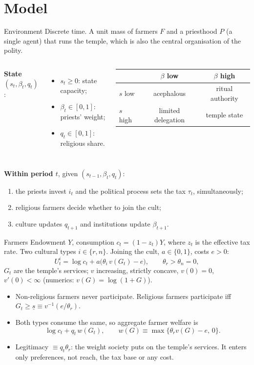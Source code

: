 \documentclass[11pt,aspectratio=169]{beamer}
\begin{document}
\section{Model}

\begin{frame}{Environment}
Discrete time. A unit mass of farmers $F$ and a priesthood $P$ (a single agent) that runs the
temple, which is also the central organisation of the polity.

\medskip
\begin{columns}[T]
\textbf{State} $(s_t,\beta_t,q_t)$:
\begin{itemize}
\item $s_t\ge0$: state capacity;
\item $\beta_t\in[0,1]$: priests' weight;
\item $q_t\in[0,1]$: religious share.
\end{itemize}
\centering\small
\begin{tabular}{l|cc}
 & $\beta$ low & $\beta$ high \\
\hline
$s$ low & acephalous & ritual authority\\[3pt]
$s$ high & limited delegation & temple state
\end{tabular}
\end{columns}

\medskip
\textbf{Within period $t$}, given $(s_{t-1},\beta_t,q_t)$:
\begin{enumerate}
\item the priests invest $i_t$ and the political process sets the tax $\tau_t$, simultaneously;
\item religious farmers decide whether to join the cult;
\item culture updates $q_{t+1}$ and institutions update $\beta_{t+1}$.
\end{enumerate}
\end{frame}

\begin{frame}{Farmers}
Endowment $Y$, consumption $c_t=(1-z_t)Y$, where $z_t$ is the effective tax rate. Two cultural
types $i\in\{r,n\}$. Joining the cult, $a\in\{0,1\}$, costs $e>0$:
\[
U^i_t=\log c_t+a\bigl(\theta_i\,v(G_t)-e\bigr),\qquad \theta_r>\theta_n=0,
\]
$G_t$ are the temple's services; $v$ increasing, strictly concave, $v(0)=0$, $v'(0)<\infty$
(numerics: $v(G)=\log(1+G)$).
\begin{itemize}
\item Non-religious farmers never participate. Religious farmers participate iff
$G_t\ge\underline s\equiv v^{-1}(e/\theta_r)$.
\item Both types consume the same, so aggregate farmer welfare is
\[
\log c_t+q_t\,w(G_t),\qquad w(G)\equiv\max\{\theta_rv(G)-e,\,0\}.
\]
\item \alert{Legitimacy} $\equiv q_t\theta_r$: the weight society puts on the temple's services.
It enters only preferences, not reach, the tax base or any cost.
\end{itemize}
\end{frame}
\end{document}

